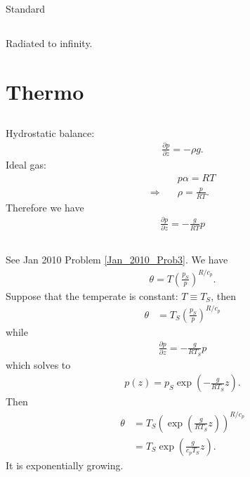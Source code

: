 \documentclass[11pt,letterpaper]{book}
\theoremstyle{definition}
\newcommand{\pe}{\partial}
\newcommand{\thus}{\Rightarrow \quad }
\begin{document}
\subsection{}
Standard

\subsection{}
Radiated to infinity.

\section{Thermo}\label{prob:aug_2015_2}
\subsection{}
Hydrostatic balance:
\begin{align*}
    \frac{\pe p}{\pe z} = -\rho g.
\end{align*}
Ideal gas:
\begin{align*}
    &p\alpha = RT\\
    \thus &\rho = \frac{p}{RT}.
\end{align*}
Therefore we have
\begin{align*}
    \frac{\pe p}{\pe z} = -\frac{g}{RT} p
\end{align*}

\subsection{}
See Jan 2010 Problem \ref{Jan_2010_Prob3}. We have
\begin{align*}
    \theta = T\left(\frac{p_S}{p}\right)^{R/c_p}.
\end{align*}
Suppose that the temperate is constant: $T\equiv T_S$, then
\begin{align*}
    \theta &= T_S\left(\frac{p_S}{p}\right)^{R/c_p}
\end{align*}
while
\begin{align*}
    \frac{\pe p}{\pe z} = -\frac{g}{RT_S} p
\end{align*}
which solves to
\begin{align*}
    p(z) = p_S\exp\left( -\frac{g}{RT_S}z \right).
\end{align*}
Then
\begin{align*}
    \theta &= T_S\left(\exp\left( \frac{g}{RT_S}z \right)\right)^{R/c_p}\\
    &= T_S \exp\left( \frac{g}{c_p T_S}z \right).
\end{align*}
It is exponentially growing.
\end{document}
